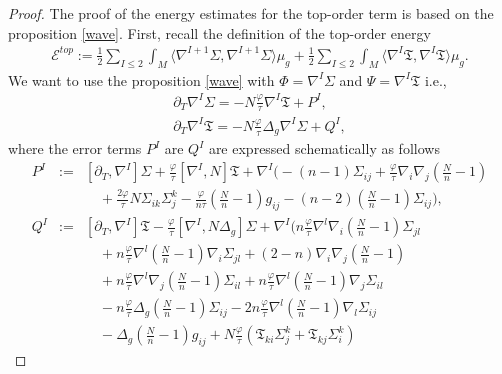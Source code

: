 \documentclass{amsart}
\begin{document}
\begin{proof}
The proof of the energy estimates for the top-order term is based on the proposition \ref{wave}. First, recall the definition of the top-order energy
\begin{align}
    \mathscr{E}^{top}:=\frac{1}{2}\sum_{I\leq 2}\int_{M}\langle\nabla^{I+1}\Sigma,\nabla^{I+1}\Sigma\rangle \mu_{g}+\frac{1}{2}\sum_{I\leq 2}\int_{M}\langle\nabla^{I}\mathfrak{T},\nabla^{I}\mathfrak{T}\rangle\mu_{g}.
\end{align}
We want to use the proposition \ref{wave} with $\Phi=\nabla^{I}\Sigma$ and $\Psi=\nabla^{I}\mathfrak{T}$ i.e., 
\begin{align}
\label{eq:wave1}
 \partial_{T}\nabla^{I}\Sigma=-N\frac{\varphi}{\tau}\nabla^{I}\mathfrak{T}+P^{I},\\
 \label{eq:wave2}
 \partial_{T}\nabla^{I}\mathfrak{T}=-N\frac{\varphi}{\tau}\Delta_{g}\nabla^{I}\Sigma+Q^{I},
\end{align}
where the error terms $P^{I}$ are $Q^{I}$ are expressed schematically as follows 
\begin{align}
P^{I} &:=& [\partial_{T},\nabla^{I}]\Sigma 
+ \frac{\varphi}{\tau}[\nabla^{I},N]\mathfrak{T} 
+ \nabla^{I}\Bigg( 
  -(n-1)\Sigma_{ij} 
  + \frac{\varphi}{\tau} \nabla_{i}\nabla_{j}\left(\frac{N}{n}-1\right) \nonumber \\
&&\quad 
  + \frac{2\varphi}{\tau}N \Sigma_{ik}\Sigma^{k}_{j}
  - \frac{\varphi}{n\tau}\left(\frac{N}{n}-1\right)g_{ij} 
  - (n-2)\left(\frac{N}{n}-1\right)\Sigma_{ij} 
\Bigg), \\
Q^{I} &:=& [\partial_{T},\nabla^{I}]\mathfrak{T} 
- \frac{\varphi}{\tau}[\nabla^{I},N\Delta_{g}]\Sigma 
+ \nabla^{I}\Bigg(
    n\frac{\varphi}{\tau} \nabla^{l}\nabla_{i}\left(\frac{N}{n}-1\right)\Sigma_{jl} \nonumber \\
&&\quad 
  + n\frac{\varphi}{\tau} \nabla^{l}\left(\frac{N}{n}-1\right)\nabla_{i}\Sigma_{jl}
  + (2 - n)\nabla_{i}\nabla_{j}\left(\frac{N}{n}-1\right) \nonumber \\
&&\quad 
  + n\frac{\varphi}{\tau} \nabla^{l}\nabla_{j}\left(\frac{N}{n}-1\right)\Sigma_{il}
  + n\frac{\varphi}{\tau} \nabla^{l}\left(\frac{N}{n}-1\right)\nabla_{j}\Sigma_{il} \nonumber \\
&&\quad 
  - n\frac{\varphi}{\tau} \Delta_{g}\left(\frac{N}{n}-1\right)\Sigma_{ij}
  - 2n\frac{\varphi}{\tau} \nabla^{l}\left(\frac{N}{n}-1\right)\nabla_{l}\Sigma_{ij} \nonumber \\
&&\quad 
  - \Delta_{g}\left(\frac{N}{n}-1\right)g_{ij}
  + N\frac{\varphi}{\tau}\left( \mathfrak{T}_{ki}\Sigma^{k}_{j} + \mathfrak{T}_{kj}\Sigma^{k}_{i} \right)

\end{align}
\end{proof}
\end{document}
